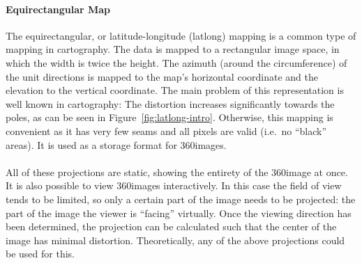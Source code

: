 \paragraph{Equirectangular Map}
The equirectangular, or latitude-longitude (latlong) mapping is a common type of mapping in cartography. The data is mapped to a rectangular image space, in which the width is twice the height. The azimuth (around the circumference) of the unit directions is mapped to the map's horizontal coordinate and the elevation to the vertical coordinate. The main problem of this representation is well known in cartography: The distortion increases significantly towards the poles, as can be seen in Figure~\ref{fig:latlong-intro}. Otherwise, this mapping is convenient as it has very few seams and all pixels are valid (i.e.\ no ``black'' areas). It is used as a storage format for 360\degree images.
\cite[p. 538]{hdrbook}

\paragraph*{}
All of these projections are static, showing the entirety of the 360\degree image at once. It is also possible to view 360\degree images interactively. In this case the field of view tends to be limited, so only a certain part of the image needs to be projected: the part of the image the viewer is ``facing'' virtually. Once the viewing direction has been determined, the projection can be calculated such that the center of the image has minimal distortion. Theoretically, any of the above projections could be used for this. 

